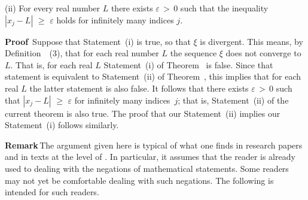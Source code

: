 \V

        (ii) For every real number $L$ there exists ${\varepsilon}\,>\,0$ such that the inequality $|x_{j}-L|\,\,{\geq}\,\,{\varepsilon}$ holds for infinitely many indices $j$.

\V

        {\bf Proof}\, Suppose that Statement~(i) is true, so that ${\xi}$ is divergent. This means, by Definition~~(3),
    that for each real number $L$ the sequence ${\xi}$ does not converge to~$L$. That is, for each real $L$ Statement~(i) of Theorem~ is false.
    Since that statement is equivalent to Statement~(ii) of Theorem~, this implies that for each real $L$ the latter statement is also false.
    It follows that there exists ${\varepsilon}\,>\,0$ such that $|x_{j}-L|\,\,{\geq}\,\,{\varepsilon}$ for infinitely many indices~$j$;
    that is, Statement~(ii) of the current theorem is also true. The proof that our Statement~(ii) implies our Statement~(i) follows similarly.
    
\V

        {\bf Remark}\,The argument given here is typical of what one finds in research papers and in texts at the level of {\ThisText}.
    In particular, it assumes that the reader is already used to dealing with the negations of mathematical statements.
    Some readers may not yet be comfortable dealing with such negations. The following {\Note} is intended for such readers.

\V

